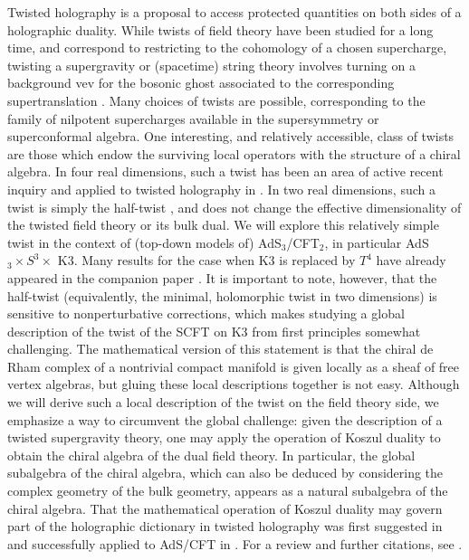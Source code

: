 \documentclass[11pt]{amsart}
\begin{document}
Twisted holography \cite{} is a proposal to access protected quantities on both sides of a holographic duality. While twists of field theory have been studied for a long time, and correspond to restricting to the cohomology of a chosen supercharge, twisting a supergravity or (spacetime) string theory involves turning on a background vev for the bosonic ghost associated to the corresponding supertranslation \cite{}. Many choices of twists are possible, corresponding to the family of nilpotent supercharges available in the supersymmetry or superconformal algebra. One interesting, and relatively accessible, class of twists are those which endow the surviving local operators with the structure of a chiral algebra. In four real dimensions, such a twist has been an area of active recent inquiry \cite{} and applied to twisted holography in \cite{}. In two real dimensions, such a twist is simply the half-twist \cite{}, and does not change the effective dimensionality of the twisted field theory or its bulk dual. We will explore this relatively simple twist in the context of (top-down models of) AdS$_3$/CFT$_2$, in particular AdS$_3 \times S^3 \times$ K3. Many results for the case when K3 is replaced by $T^4$ have already appeared in the companion paper \cite{}. 
It is important to note, however, that the half-twist (equivalently, the minimal, holomorphic twist in two dimensions) is sensitive to nonperturbative corrections, which makes studying a global description of the twist of the SCFT on K3 from first principles somewhat challenging. The mathematical version of this statement is that the chiral de Rham complex of a nontrivial compact manifold is given locally as a sheaf of free vertex algebras, but gluing these local descriptions together is not easy. Although we will derive such a local description of the twist on the field theory side, we emphasize a way to circumvent the global challenge: given the description of a twisted supergravity theory, one may apply the operation of Koszul duality to obtain the chiral algebra of the dual field theory. In particular, the global subalgebra of the chiral algebra, which can also be deduced by considering the complex geometry of the bulk geometry, appears as a natural subalgebra of the chiral algebra. That the mathematical operation of Koszul duality may govern part of the holographic dictionary in twisted holography was first suggested in \cite{} and successfully applied to AdS/CFT in \cite{}. For a review and further citations, see \cite{}.
\end{document}

